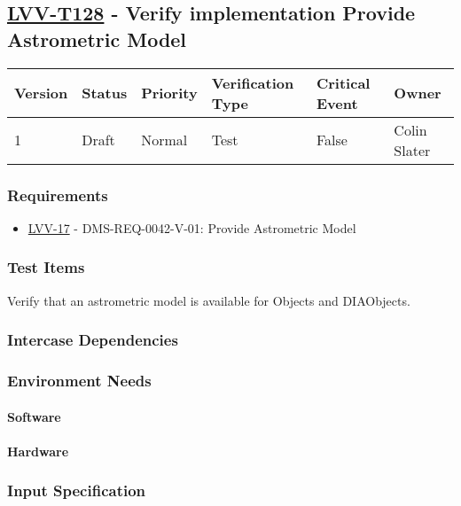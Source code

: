 \subsection{\href{https://jira.lsstcorp.org/secure/Tests.jspa\#/testCase/LVV-T128}{LVV-T128}
    - Verify implementation Provide Astrometric Model}\label{lvv-t128}

\begin{longtable}[]{llllll}
\toprule
Version & Status & Priority & Verification Type & Critical Event & Owner
\\\midrule
1 & Draft & Normal &
Test & False & Colin Slater
\\\bottomrule
\end{longtable}

\subsubsection{Requirements}
\begin{itemize}
\item \href{https://jira.lsstcorp.org/browse/LVV-17}{LVV-17} - DMS-REQ-0042-V-01: Provide Astrometric Model
\end{itemize}

\subsubsection{Test Items}
Verify that an astrometric model is available for Objects and
DIAObjects.



\subsubsection{Intercase Dependencies}

\subsubsection{Environment Needs}

\paragraph{Software}

\paragraph{Hardware}

\subsubsection{Input Specification}

